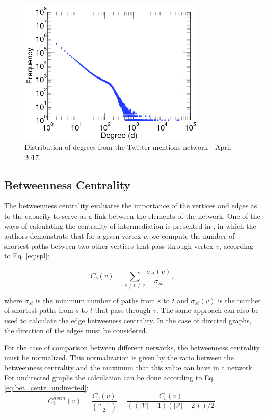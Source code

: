 \begin{figure}[htb]
	\centering
	\includegraphics[width=0.8\textwidth]{fig/intro/twitter_degree_distr.png}
	\caption{Distribution of degrees from the Twitter mentions network - April 2017.}
	\label{fig:twitter_degree_distr}
\end{figure}


\subsection*{Betweenness Centrality}
\label{subsec:betweenness_centr}
The betweenness centrality evaluates the importance of the vertices and edges as to the capacity to serve as a link between the elements of the network. One of the ways of calculating the centrality of intermediation is presented in \cite{Zafarani2014}, in which the authors demonstrate that for a given vertex $v$, we compute the number of shortest paths between two other vertices that pass through vertex $v$, according to Eq. \ref{eq:spl}:

\begin{equation}
    \label{eq:spl}
    C_b(v) = \sum_{s \neq t \neq v} \frac{\sigma_{st}(v)}{\sigma_{st}},
\end{equation}
        
where $\sigma_{st}$ is the minimum number of paths from $s$ to $t$ and $\sigma_{st}(v)$ is the number of shortest paths from $s$ to $t$ that pass through $v$. The same approach can also be used to calculate the edge betweeness centrality. In the case of directed graphs, the direction of the edges must be considered.

For the case of comparison between different networks, the betweenness centrality must be normalized. This normalization is given by the ratio between the betweenness centrality and the maximum that this value can have in a network. For undirected graphs the calculation can be done according to Eq. \ref{eq:bet_centr_undirected}:
\begin{equation}
    \label{eq:bet_centr_undirected}
	C^{norm}_b(v) = \frac{C_b(v)}{\binom{n-1}{2}} = \frac{C_b(v)}{((|\mathcal{V}|-1)(|\mathcal{V}|-2))/2}.
\end{equation}

